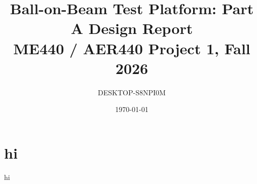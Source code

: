 \documentclass[11pt]{article}
\author{DESKTOP-S8NPI0M}
\date{\today}
\title{Ball-on-Beam Test Platform: Part A Design Report\\\medskip
\large ME440 / AER440 Project 1, Fall 2026}
\begin{document}
\maketitle
\tableofcontents

\section{hi}
\label{sec:org08b7b4d}
hi
\end{document}
